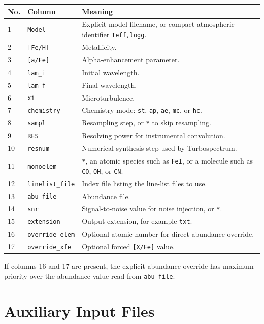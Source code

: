 \documentclass[11pt,a4paper]{article}
\newcommand{\code}[1]{\texttt{#1}}
\begin{document}
\begin{longtable}{p{}p{}p{}}
\toprule
\textbf{No.} & \textbf{Column} & \textbf{Meaning} \\
\midrule
1 & \code{Model} & Explicit model filename, or compact atmospheric identifier \code{Teff,logg}. \\
2 & \code{[Fe/H]} & Metallicity. \\
3 & \code{[a/Fe]} & Alpha-enhancement parameter. \\
4 & \code{lam\_i} & Initial wavelength. \\
5 & \code{lam\_f} & Final wavelength. \\
6 & \code{xi} & Microturbulence. \\
7 & \code{chemistry} & Chemistry mode: \code{st}, \code{ap}, \code{ae}, \code{mc}, or \code{hc}. \\
8 & \code{sampl} & Resampling step, or \code{*} to skip resampling. \\
9 & \code{RES} & Resolving power for instrumental convolution. \\
10 & \code{resnum} & Numerical synthesis step used by Turbospectrum. \\
11 & \code{monoelem} & \code{*}, an atomic species such as \code{FeI}, or a molecule such as \code{CO}, \code{OH}, or \code{CN}. \\
12 & \code{linelist\_file} & Index file listing the line-list files to use. \\
13 & \code{abu\_file} & Abundance file. \\
14 & \code{snr} & Signal-to-noise value for noise injection, or \code{*}. \\
15 & \code{extension} & Output extension, for example \code{txt}. \\
16 & \code{override\_elem} & Optional atomic number for direct abundance override. \\
17 & \code{override\_xfe} & Optional forced \code{[X/Fe]} value. \\
\bottomrule
\end{longtable}

\begin{importantbox}
If columns 16 and 17 are present, the explicit abundance override has maximum priority over the abundance value read from \code{abu\_file}.
\end{importantbox}

\section{Auxiliary Input Files}
\end{document}
